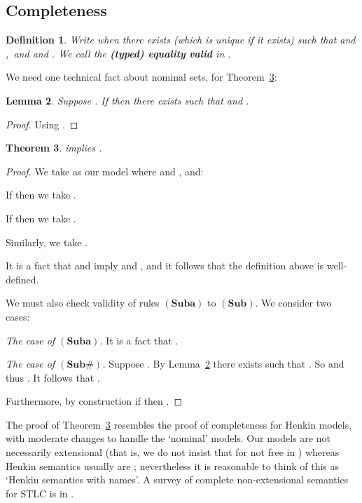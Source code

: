 \documentclass[submission,copyright]{eptcs}
\newtheorem{thrm}{Theorem}[section]
\newtheorem{lemm}[thrm]{Lemma}
\newtheorem{defn}[thrm]{Definition}
\newcommand{\deffont}[1]{\textbf{#1}}
\newcommand{\rulefont}[1]{\ensuremath{(\mathbf{#1})}}
\begin{document}
\subsection{Completeness}
\label{subsect.completeness}

\begin{defn}
\label{defn.ment}
Write  when there exists  (which is unique if it exists) such that  and ,\ and  and . 
We call the \deffont{(typed) equality}  \deffont{valid} in .
\end{defn}



We need one technical fact about nominal sets, for Theorem~\ref{thrm.st.complete}: 
\begin{lemm}
\label{lemm.beeq.fresh.rep}
Suppose .
If  then there exists  such that  and .
\end{lemm}
\begin{proof}
Using \cite[Lemma~7.6.2]{gabbay:nomtnl}.
\end{proof}


\begin{thrm}
\label{thrm.st.complete}
 implies .
\end{thrm}
\begin{proof}
We take as our model  where  and , and:
\begin{itemize*}
\item
If  then we take .
\item
If  then we take .
\item
Similarly, we take .
\end{itemize*}
It is a fact that  and  imply  and , and it follows that the definition above is well-defined.

We must also check validity of rules \rulefont{Suba} to \rulefont{Sub\text{}}. 
We consider two cases:
\begin{itemize*}
\item
\emph{The case of \rulefont{Suba}.}\quad
It is a fact that . 
\item
\emph{The case of \rulefont{Sub\#}.}\quad
Suppose .
By Lemma~\ref{lemm.beeq.fresh.rep} there exists  such that .
So  and thus .
It follows that . 
\end{itemize*}

Furthermore, by construction if  then . 
\end{proof}
The proof of Theorem~\ref{thrm.st.complete} resembles the proof of completeness for Henkin models, with moderate changes to handle the `nominal' models.
Our models are not necessarily extensional (that is, we do not insist that  for  not free in ) whereas Henkin semantics usually are \cite{henkin:comtot}; nevertheless it is reasonable to think of this as `Henkin semantics with names'.
A survey of complete non-extensional semantics for STLC is in \cite{benzmuller:higose}.
\end{document}

